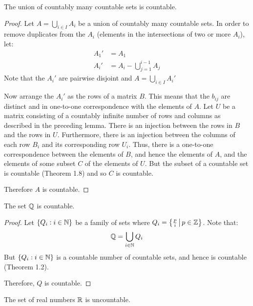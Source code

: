 \documentclass[letterpaper,12pt,fleqn]{article}
\begin{document}
\begin{theorem}[1.12]
  The union of countably many countable sets is countable.
\end{theorem}

\begin{proof}
  Let \(A=\bigcup_{i\in I}A_i\) be a union of countably many countable sets.  In order to remove duplicates from the
  \(A_i\) (elements in the intersections of two or more \(A_i\)), let:
  \begin{align*}
    A_1' &= A_1 \\
    A_i' &= A_i-\bigcup_{j=1}^{i-1}A_j
  \end{align*}
  Note that the \(A_i'\) are pairwise disjoint and \(A=\bigcup_{i\in I}A_i'\)

  Now arrange the \(A_i'\) as the rows of a matrix \(B\).  This means that the \(b_{ij}\) are distinct and in
  one-to-one correspondence with the elements of \(A\).  Let \(U\) be a matrix consisting of a countably infinite
  number of rows and columns as described in the preceding lemma.  There is an injection between the rows in \(B\)
  and the rows in \(U\).  Furthermore, there is an injection between the columns of each row \(B_i\) and its
  corresponding row \(U_i\).  Thus, there is a one-to-one correspondence between the elements of \(B\), and hence
  the elements of \(A\), and the elements of some subset \(C\) of the elements of \(U\).  But the subset of a
  countable set is countable (Theorem 1.8) and so \(C\) is countable.

  Therefore \(A\) is countable.
\end{proof}

\begin{theorem}[1.13]
  The set \(\mathbb{Q}\) is countable.
\end{theorem}

\begin{proof}
  Let \(\{Q_i:i\in\mathbb{N}\}\) be a family of sets where \(Q_i=\left\{{\frac{p}{i}}\,\middle|\,{p\in\mathbb{Z}}\right\}\).  Note that:
  \[\mathbb{Q}=\bigcup_{i\in\mathbb{N}}Q_i\]
  But \(\{Q_i:i\in\mathbb{N}\}\) is a countable number of countable sets, and hence is countable (Theorem 1.2).

  Therefore, \(Q\) is countable.
\end{proof}

\begin{theorem}[1.16]
  The set of real numbers \(\mathbb{R}\) is uncountable.
\end{theorem}
\end{document}
